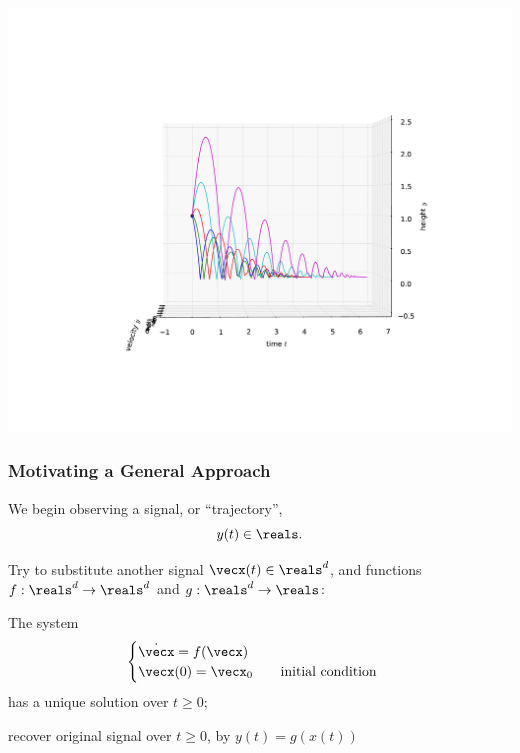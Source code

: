\documentclass[12pt]{beamer}
\begin{document}
\begin{frame}
\vfill\centering
\includegraphics[width=.9\linewidth]{pic/bouncing_ball_reflattened}
\vfill\null
\end{frame}




\begin{frame}
\frametitle{Motivating a General Approach}

\begin{itemize}

\vitem We begin observing a signal, or ``trajectory'',
\[
y(t) \in \reals.
\]



\vitem Try to substitute another signal $\vecx(t) \in \reals^d$, and
functions $f : \reals^d \to \reals^d$ and $g : \reals^d \to \reals$:

\begin{enumerate}
\vitem The system
\[
\begin{cases}
	\dot \vecx = f(\vecx) \\
	\vecx(0) = \vecx_0 \qquad \text{initial condition}
\end{cases}
\]
has a unique solution over $t \geq 0$;

\vitem recover original signal over $t \geq 0$, by $y(t) = g( x(t) )$ 


\end{enumerate}

\end{itemize}

\vfill\null
\end{frame}
\end{document}
